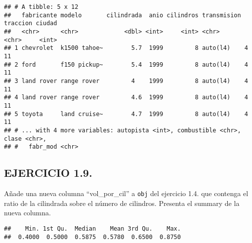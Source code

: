 \documentclass[]{article}
\newenvironment{Shaded}{\begin{snugshade}}{\end{snugshade}}
\newcommand{\CommentTok}[1]{\textcolor[rgb]{0.56,0.35,0.01}{\textit{#1}}}
\newcommand{\KeywordTok}[1]{\textcolor[rgb]{0.13,0.29,0.53}{\textbf{#1}}}
\newcommand{\NormalTok}[1]{#1}
\newcommand{\OperatorTok}[1]{\textcolor[rgb]{0.81,0.36,0.00}{\textbf{#1}}}
\newcommand{\OtherTok}[1]{\textcolor[rgb]{0.56,0.35,0.01}{#1}}
\newcommand{\StringTok}[1]{\textcolor[rgb]{0.31,0.60,0.02}{#1}}
\begin{document}
\begin{verbatim}
## # A tibble: 5 x 12
##   fabricante modelo       cilindrada  anio cilindros transmision traccion ciudad
##   <chr>      <chr>             <dbl> <int>     <int> <chr>       <chr>     <int>
## 1 chevrolet  k1500 tahoe~        5.7  1999         8 auto(l4)    4            11
## 2 ford       f150 pickup~        5.4  1999         8 auto(l4)    4            11
## 3 land rover range rover         4    1999         8 auto(l4)    4            11
## 4 land rover range rover         4.6  1999         8 auto(l4)    4            11
## 5 toyota     land cruise~        4.7  1999         8 auto(l4)    4            11
## # ... with 4 more variables: autopista <int>, combustible <chr>, clase <chr>,
## #   fabr_mod <chr>
\end{verbatim}

\hypertarget{ejercicio-1.9.}{%
\subsection{EJERCICIO 1.9.}\label{ejercicio-1.9.}}

Añade una nueva columna ``vol\_por\_cil'' a \texttt{obj} del ejercicio
1.4. que contenga el ratio de la cilindrada sobre el número de
cilindros. Presenta el summary de la nueva columna.

\begin{Shaded}
\end{Shaded}

\begin{verbatim}
##    Min. 1st Qu.  Median    Mean 3rd Qu.    Max. 
##  0.4000  0.5000  0.5875  0.5780  0.6500  0.8750
\end{verbatim}
\end{document}
